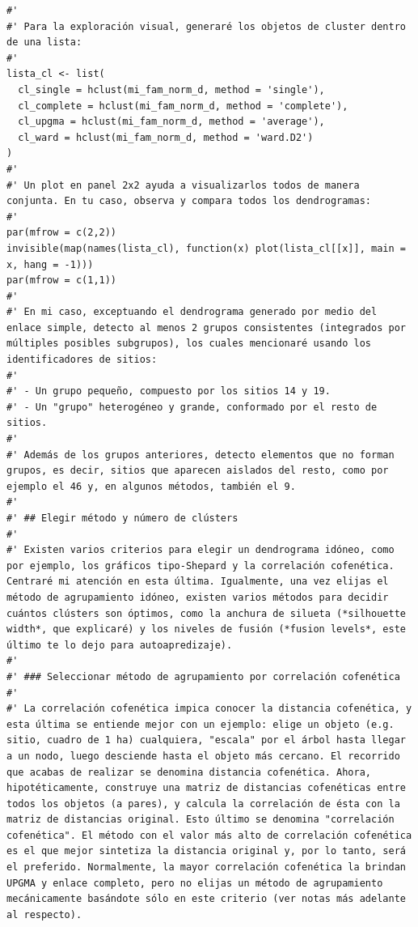 \documentclass[11pt,]{article}
\begin{document}
\begin{verbatim}
#'
#' Para la exploración visual, generaré los objetos de cluster dentro de una lista:
#' 
lista_cl <- list(
  cl_single = hclust(mi_fam_norm_d, method = 'single'),
  cl_complete = hclust(mi_fam_norm_d, method = 'complete'),
  cl_upgma = hclust(mi_fam_norm_d, method = 'average'),
  cl_ward = hclust(mi_fam_norm_d, method = 'ward.D2')
)
#' 
#' Un plot en panel 2x2 ayuda a visualizarlos todos de manera conjunta. En tu caso, observa y compara todos los dendrogramas:
#' 
par(mfrow = c(2,2))
invisible(map(names(lista_cl), function(x) plot(lista_cl[[x]], main = x, hang = -1)))
par(mfrow = c(1,1))
#' 
#' En mi caso, exceptuando el dendrograma generado por medio del enlace simple, detecto al menos 2 grupos consistentes (integrados por múltiples posibles subgrupos), los cuales mencionaré usando los identificadores de sitios:
#' 
#' - Un grupo pequeño, compuesto por los sitios 14 y 19.
#' - Un "grupo" heterogéneo y grande, conformado por el resto de sitios.
#' 
#' Además de los grupos anteriores, detecto elementos que no forman grupos, es decir, sitios que aparecen aislados del resto, como por ejemplo el 46 y, en algunos métodos, también el 9.
#' 
#' ## Elegir método y número de clústers
#' 
#' Existen varios criterios para elegir un dendrograma idóneo, como por ejemplo, los gráficos tipo-Shepard y la correlación cofenética. Centraré mi atención en esta última. Igualmente, una vez elijas el método de agrupamiento idóneo, existen varios métodos para decidir cuántos clústers son óptimos, como la anchura de silueta (*silhouette width*, que explicaré) y los niveles de fusión (*fusion levels*, este último te lo dejo para autoapredizaje).
#' 
#' ### Seleccionar método de agrupamiento por correlación cofenética
#' 
#' La correlación cofenética impica conocer la distancia cofenética, y esta última se entiende mejor con un ejemplo: elige un objeto (e.g. sitio, cuadro de 1 ha) cualquiera, "escala" por el árbol hasta llegar a un nodo, luego desciende hasta el objeto más cercano. El recorrido que acabas de realizar se denomina distancia cofenética. Ahora, hipotéticamente, construye una matriz de distancias cofenéticas entre todos los objetos (a pares), y calcula la correlación de ésta con la matriz de distancias original. Esto último se denomina "correlación cofenética". El método con el valor más alto de correlación cofenética es el que mejor sintetiza la distancia original y, por lo tanto, será el preferido. Normalmente, la mayor correlación cofenética la brindan UPGMA y enlace completo, pero no elijas un método de agrupamiento mecánicamente basándote sólo en este criterio (ver notas más adelante al respecto).

\end{verbatim}
\end{document}

